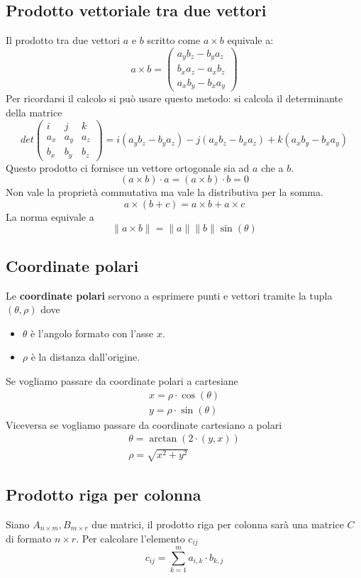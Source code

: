 \subsection{Prodotto vettoriale tra due vettori}
Il prodotto tra due vettori $a$ e $b$ scritto come $a \times b$ equivale a:
\[
	a \times b = \begin{pmatrix}
		a_y b_z - b_y a_z \\ b_x a_z - a_x b_z \\ a_x b_y - b_x a_y
	\end{pmatrix}
\]
Per ricordarsi il calcolo si pu\`o usare questo metodo: si calcola il determinante della
matrice
\[
	det \begin{pmatrix}
		i   & j   & k   \\
		a_x & a_y & a_z \\
		b_x & b_y & b_z
	\end{pmatrix} =
	i(a_y b_z - b_y a_z) - j(a_x b_z - b_x a_z) + k(a_x b_y - b_x a_y)
\]
Questo prodotto ci fornisce un vettore ortogonale sia ad $a$ che a $b$.
\[ (a \times b) \cdot a = (a \times b ) \cdot b = 0 \]
Non vale la propriet\`a commutativa ma vale la distributiva per la somma.
\[ a \times (b + c) = a \times b + a \times c \]
La norma equivale a
\[ \| a \times b \| = \| a \| \| b \| \sin(\theta) \]

\subsection{Coordinate polari}
Le \textbf{coordinate polari} servono a esprimere punti e vettori tramite la tupla
$(\theta, \rho)$ dove
\begin{itemize}
	\item $\theta$ \`e l'angolo formato con l'asse $x$.
	\item $\rho$ \`e la distanza dall'origine.
\end{itemize}
Se vogliamo passare da coordinate polari a cartesiane
\begin{gather*}
	x = \rho \cdot \cos(\theta) \\
	y = \rho \cdot \sin(\theta)
\end{gather*}
Viceversa se vogliamo passare da coordinate cartesiano a polari
\begin{gather*}
	\theta = \arctan(2 \cdot (y, x)) \\
	\rho = \sqrt{x^2 + y^2}
\end{gather*}

\subsection{Prodotto riga per colonna}
Siano $A_{n \times m}, B_{m \times r}$ due matrici, il prodotto riga per colonna
sar\`a una matrice $C$ di formato $n \times r$. Per calcolare l'elemento $c_{ij}$
\[ c_{ij} = \sum_{k = 1}^m a_{i,k} \cdot b_{k,j} \]